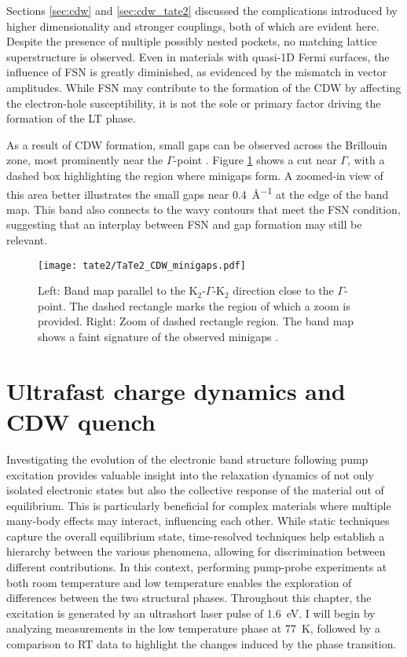 Sections \ref{sec:cdw} and \ref{sec:cdw_tate2} discussed the complications introduced by higher dimensionality and stronger couplings, both of which are evident here.
Despite the presence of multiple possibly nested pockets, no matching lattice superstructure is observed.
Even in materials with quasi-1D Fermi surfaces, the influence of FSN is greatly diminished, as evidenced by the mismatch in vector amplitudes.
While FSN may contribute to the formation of the CDW by affecting the electron-hole susceptibility, it is not the sole or primary factor driving the formation of the LT phase.

As a result of CDW formation, small gaps can be observed across the Brillouin zone, most prominently near the $\Gamma$-point \cite{lin_evidence_2022}.
Figure \ref{fig:TaTe_minigaps} shows a cut near $\Gamma$, with a dashed box highlighting the region where minigaps form.
A zoomed-in view of this area better illustrates the small gaps near \qty{0.4}{\angstrom^{-1}} at the edge of the band map.
This band also connects to the wavy contours that meet the FSN condition, suggesting that an interplay between FSN and gap formation may still be relevant.

\begin{figure}[h!]
	\centering
	\texttt{[image: tate2/TaTe2\_CDW\_minigaps.pdf]}
	\caption{Left: Band map parallel to the K$_2$-$\Gamma$-K$_2$ direction close to the $\Gamma$-point. The dashed rectangle marks the region of which a zoom is provided. Right: Zoom of dashed rectangle region. The band map shows a faint signature of the observed minigaps \cite{lin_evidence_2022}.}
	\label{fig:TaTe_minigaps}
\end{figure}

\section{Ultrafast charge dynamics and CDW quench}
\label{sec:tate_dynamics}

Investigating the evolution of the electronic band structure following pump excitation provides valuable insight into the relaxation dynamics of not only isolated electronic states but also the collective response of the material out of equilibrium.
This is particularly beneficial for complex materials where multiple many-body effects may interact, influencing each other.
While static techniques capture the overall equilibrium state, time-resolved techniques help establish a hierarchy between the various phenomena, allowing for discrimination between different contributions.
In this context, performing pump-probe experiments at both room temperature and low temperature enables the exploration of differences between the two structural phases.
Throughout this chapter, the excitation is generated by an ultrashort laser pulse of \qty{1.6}{\electronvolt}.
I will begin by analyzing measurements in the low temperature phase at \qty{77}{\kelvin}, followed by a comparison to RT data to highlight the changes induced by the phase transition.

